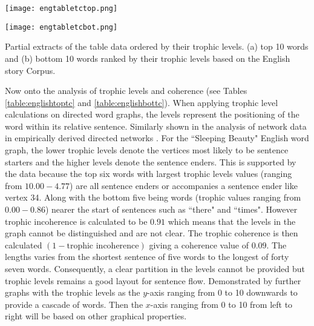 \begin{table}[!htb]
\centering
\begin{subtable}{.45\textwidth}
	\centering
	\texttt{[image: engtabletctop.png]}
	\caption{}
	\label{table:englishtoptc}
\end{subtable}
\hfill
\begin{subtable}{.45\textwidth}
	\centering
	\texttt{[image: engtabletcbot.png]}
	\caption{}
	\label{table:englishbottc}
\end{subtable}
\caption{Partial extracts of the table data ordered by their trophic levels. (a) top 10 words and (b) bottom 10 words ranked by their trophic levels based on the English story Corpus.}
\end{table}

Now onto the analysis of trophic levels and coherence (see Tables \ref{table:englishtoptc} and \ref{table:englishbottc}). When applying trophic level calculations on directed word graphs, the levels represent the positioning of the word within its relative sentence. Similarly shown in the analysis of network data in empirically derived directed networks \cite{johnson2017looplessness}. For the ``Sleeping Beauty" English word graph, the lower trophic levels denote the vertices most likely to be sentence starters and the higher levels denote the sentence enders. This is supported by the data because the top six words with largest trophic levels values (ranging from $10.00-4.77$) are all sentence enders or accompanies a sentence ender like vertex 34. Along with the bottom five being words (trophic values ranging from $0.00-0.86$) nearer the start of sentences such as ``there" and ``times". However trophic incoherence is calculated to be $0.91$ which means that the levels in the graph cannot be distinguished and are not clear. The $\text{trophic coherence}$ is then calculated $(1 - \text{trophic incoherence})$ giving a coherence value of $0.09$. The lengths varies from the shortest sentence of five words to the longest of forty seven words. Consequently, a clear partition in the levels cannot be provided but trophic levels remains a good layout for sentence flow. Demonstrated by further graphs with the trophic levels as the $y$-axis ranging from 0 to 10 downwards to provide a cascade of words. Then the $x$-axis ranging from 0 to 10 from left to right will be based on other graphical properties.

